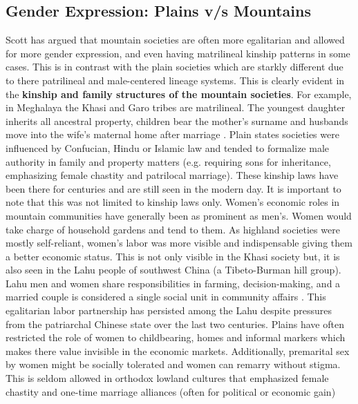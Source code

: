 \subsection{Gender Expression: Plains v/s Mountains}
\begin{sloppypar}
    Scott has argued that mountain societies are often more egalitarian and allowed for more gender expression, and even having matrilineal kinship patterns in some cases. This is in contrast with the plain societies which are starkly different due to there patrilineal and male\hyp{}centered lineage systems. This is clearly evident in the \textbf{kinship and family structures of the mountain societies}. For example, in Meghalaya the Khasi and Garo tribes are matrilineal. The youngest daughter inherits all ancestral property, children bear the mother's surname and husbands move into the wife’s maternal home after marriage \citep{Allen_2012}. Plain states societies were influenced by Confucian, Hindu or Islamic law and tended to formalize male authority in family and property matters (e.g. requiring sons for inheritance, emphasizing female chastity and patrilocal marriage). These kinship laws have been there for centuries and are still seen in the modern day. It is important to note that this was not limited to kinship laws only. Women’s economic roles in mountain communities have generally been as prominent as men’s. Women would take charge of household gardens and tend to them. As highland societies were mostly self\hyp{}reliant, women's labor was more visible and indispensable giving them a better economic status. This is not only visible in the Khasi society but, it is also seen in the Lahu people of southwest China (a Tibeto\hyp{}Burman hill group). Lahu men and women share responsibilities in farming, decision\hyp{}making,  and a married couple is considered a single social unit in community affairs \citep{Du_2015}. This egalitarian labor partnership has persisted among the Lahu despite pressures from the patriarchal Chinese state over the last two centuries. Plains have often restricted the role of women to childbearing, homes and informal markers which makes there value invisible in the economic markets. Additionally, premarital sex by women might be socially tolerated and women can remarry without stigma. This is seldom allowed in orthodox lowland cultures that emphasized female chastity and one\hyp{}time marriage alliances (often for political or economic gain)

\end{sloppypar}
